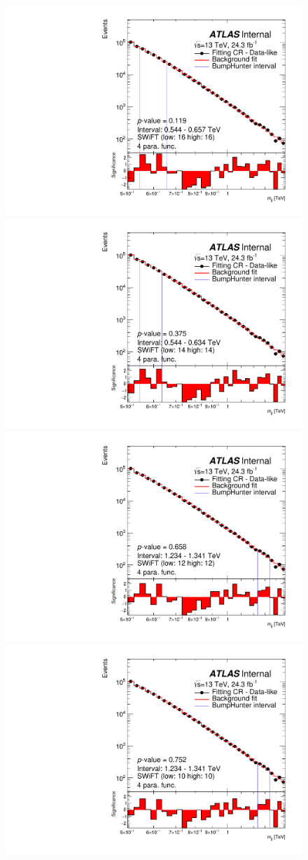 \begin{figure}[!htb]
\captionsetup[subfigure]{aboveskip=0pt,justification=centering}
\centering
{} {
  \includegraphics[width=0.45\linewidth, angle=0]{figs/Dibjet/LowMass/FitStudy/bhFit_corrFitCR_dataLike_v13_4para_low16_high16.pdf}
}
 {
  \includegraphics[width=0.45\linewidth, angle=0]{figs/Dibjet/LowMass/FitStudy/bhFit_corrFitCR_dataLike_v13_4para_low14_high14.pdf}
}
 {
  \includegraphics[width=0.45\linewidth, angle=0]{figs/Dibjet/LowMass/FitStudy/bhFit_corrFitCR_dataLike_v13_4para_low12_high12.pdf}
}
 {
  \includegraphics[width=0.45\linewidth, angle=0]{figs/Dibjet/LowMass/FitStudy/bhFit_corrFitCR_dataLike_v13_4para_low10_high10.pdf}
}
\end{figure}
